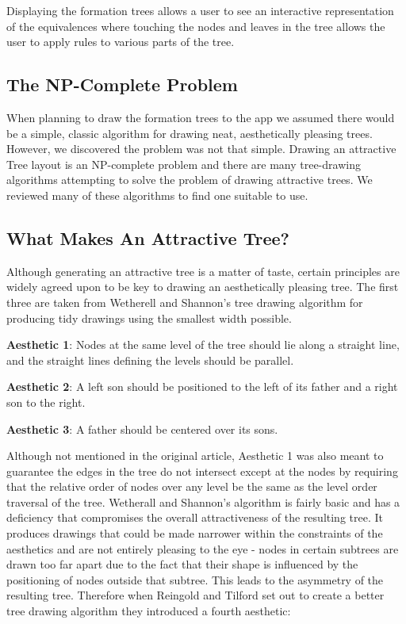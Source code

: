 \documentclass{report}
\begin{document}
Displaying the formation trees allows a user to see an interactive representation of the equivalences where touching the nodes and leaves in the tree allows the user to apply rules to various parts of the tree.

\subsection{The NP-Complete Problem}

When planning to draw the formation trees to the app we assumed there would be a simple, classic algorithm for drawing neat, aesthetically pleasing trees. However, we discovered the problem was not that simple. Drawing an attractive Tree layout is an NP-complete problem\cite{npcompletetrees} and there are many tree-drawing algorithms attempting to solve the problem of drawing attractive trees. We reviewed many of these algorithms to find one suitable to use.

\subsection{What Makes An Attractive Tree?}

Although generating an attractive tree is a matter of taste, certain principles are widely agreed upon to be key to drawing an aesthetically pleasing tree. The first three are taken from Wetherell and Shannon's tree drawing algorithm for producing tidy drawings using the smallest width possible\cite{tidierdrawingsws}.

\textbf{Aesthetic 1}: Nodes at the same level of the tree should lie along a straight line, and the straight lines defining the levels should be parallel. 

\textbf{Aesthetic 2}: A left son should be positioned to the left of its father and a right son to the right.

\textbf{Aesthetic 3}: A father should be centered over its sons.

Although not mentioned in the original article, Aesthetic 1 was also meant to guarantee the edges in the tree do not intersect except at the nodes by requiring that the relative order of nodes over any level be the same as the level order traversal of the tree. Wetherall and Shannon's algorithm is fairly basic and has a deficiency that compromises the overall attractiveness of the resulting tree. It produces drawings that could be made narrower within the constraints of the aesthetics and are not entirely pleasing to the eye - nodes in certain subtrees are drawn too far apart due to the fact that their shape is influenced by the positioning of nodes outside that subtree. This leads to the asymmetry of the resulting tree. Therefore when Reingold and Tilford\cite{tidierdrawingsrt} set out to create a better tree drawing algorithm they introduced a fourth aesthetic:
\end{document}
